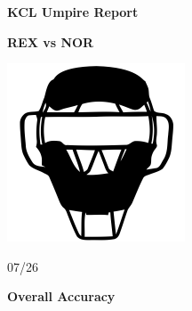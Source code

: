 \documentclass[
]{article}
\author{}
\date{\vspace{-2.5em}}
\begin{document}
\vspace*{-8em}
\begin{center}
\vspace*{-1em}
\LARGE \textbf{KCL Umpire Report}
\vspace*{-1em}
\end{center}

\begin{center}
\begin{minipage}{0.28\textwidth}
\centering
\Large \textbf{REX vs NOR}
\end{minipage}
\hfill
\begin{minipage}{0.28\textwidth}
\centering
\includegraphics[width=\textwidth]{ump-mask.png}
\end{minipage}
\hfill
\begin{minipage}{0.28\textwidth}
\centering
\Large 07/26
\end{minipage}
\vspace*{-1em}
\end{center}

\begin{center}
\centering
\vspace{1em}
\Large \textbf{Overall Accuracy}
\end{center}
\end{document}
